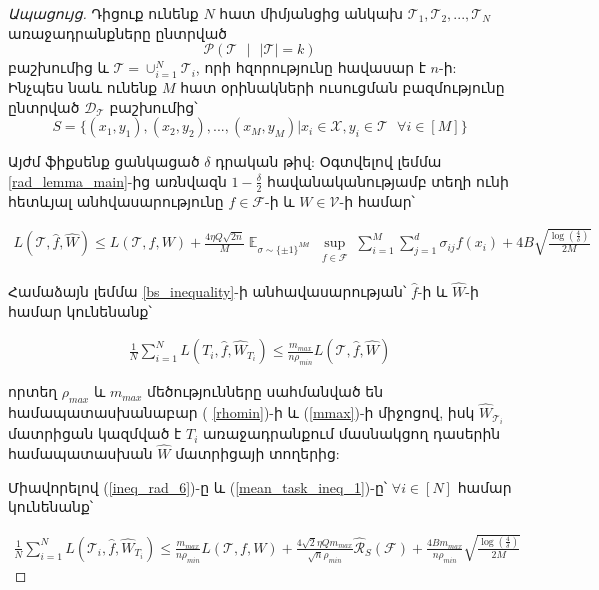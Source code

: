 \documentclass[12pt]{article}
\DeclareMathOperator*{\E}{\mathbb{E}}
\begin{document}
\begin{proof}[Ապացույց] 
Դիցուք ունենք $N$ հատ միմյանցից անկախ $\mathcal{T}_1,\mathcal{T}_2, ...,\mathcal{T}_N$  առաջադրանքները ընտրված 
$$\mathcal{P}(\mathcal{T} \text{ } |\text{ }  |\mathcal{T}| = k)$$
բաշխումից և $\mathcal{T} = \cup_{i=1}^N\mathcal{T}_i$, որի հզորությունը հավասար է $n$-ի: Ինչպես նաև ունենք $M$ հատ օրինակների ուսուցման բազմությունը ընտրված $\mathcal{D_\mathcal{T}}$ բաշխումից՝
$$S = \{(x_1, y_1), (x_2, y_2), ..., (x_M, y_M) | x_i \in \mathcal{X}, y_i \in \mathcal{T} \text{ }\forall i \in[M]\}$$

 Այժմ ֆիքսենք ցանկացած $\delta$ դրական թիվ: Օգտվելով լեմմա \ref{rad_lemma_main}-ից առնվազն $1-\frac{\delta}{2}$ հավանականությամբ տեղի ունի հետևյալ անհվասարությունը $f \in \mathcal{F}$-ի և $W \in \mathcal{V}$-ի համար՝

\begin{align}
\label{ineq_rad_6}
L(\mathcal{T}, \hat{f}, \hat{W}) \leq  L(\mathcal{T}, f, W) + \frac{4\eta Q\sqrt{2n}}{M} \E_{\sigma \sim \{\pm1\}^{Md}} \sup_{\substack{ f  \in \mathcal{F}  }}\sum_{i=1}^M \sum_{j=1}^d \sigma_{ij}f(x_i)+    4B\sqrt{\frac{\log \left( \frac{4}{\delta} \right)}{2M}}
\end{align}

\noindent Համաձայն լեմմա \ref{bs_inequality}-ի անհավասարության՝  $\hat{f}$-ի և $\hat{W}$-ի համար կունենանք՝

\begin{align}
\label{mean_task_ineq_1}
\frac{1}{N}\sum_{i=1}^N L(T_i,\hat{f}, \hat{W}_{T_i}) \leq  \frac{m_{max}}{n \rho_{min}}  L(\mathcal{T},\hat{f}, \hat{W}) 
\end{align}

\noindent որտեղ $\rho_{max}$ և $m_{max}$ մեծությունները սահմանված են համապատասխանաբար ( \ref{rhomin})-ի և (\ref{mmax})-ի միջոցով, իսկ $\hat{W}_{\mathcal{T}_i}$ մատրիցան կազմված է $T_i$ առաջադրանքում մասնակցող դասերին համապատասխան  $\hat{W}$ մատրիցայի տողերից:

Միավորելով (\ref{ineq_rad_6})-ը  և (\ref{mean_task_ineq_1})-ը՝ $\forall i \in [N]$ համար կունենանք՝



\begin{align}
\label{mean_task_ineq_2}
\frac{1}{N}\sum_{i=1}^N L(\mathcal{T}_i,\hat{f}, \hat{W}_{T_i}) \leq  \frac{m_{max}}{n \rho_{min}}  L(\mathcal{T}, f, W) +
\frac{4\sqrt{2} \eta Qm_{max}}{\sqrt{n}\rho_{min}} \hat{\mathcal{R}}_S(\mathcal{F})+    \frac{4Bm_{max}}{n\rho_{min}}\sqrt{\frac{\log \left( \frac{4}{\delta} \right)}{2M}}
\end{align}


\end{proof}
\end{document}
